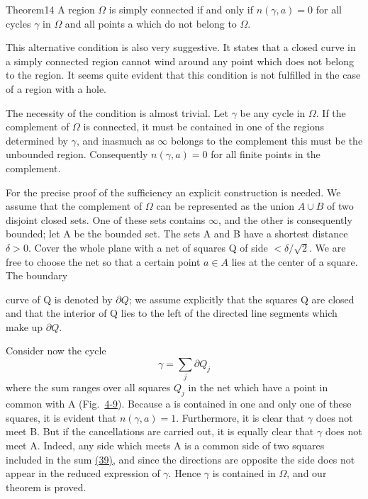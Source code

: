 \begin{originalstatement}{Theorem}{14}\label{thm:4.14}
A region $\Omega$ is simply connected if and only if $n(\gamma, a) = 0$ for all cycles $\gamma$ in $\Omega$ and all points a which do not belong to $\Omega$.
\end{originalstatement}
This alternative condition is also very suggestive. It states that a closed curve in a simply connected region cannot wind around any point which does not belong to the region. It seems quite evident that this condition is not fulfilled in the case of a region with a hole.

The necessity of the condition is almost trivial. Let $\gamma$ be any cycle in $\Omega$. If the complement of $\Omega$ is connected, it must be contained in one of the regions determined by $\gamma$, and inasmuch as $\infty$ belongs to the complement this must be the unbounded region. Consequently $n(\gamma,a)=0$ for all finite points in the complement.

For the precise proof of the sufficiency an explicit construction is needed. We assume that the complement of $\Omega$ can be represented as the union $A \cup B$ of two disjoint closed sets. One of these sets contains $\infty$, and the other is consequently bounded; let A be the bounded set. The sets A and B have a shortest distance $\delta > 0$. Cover the whole plane with a net of squares Q of side $< \delta/\sqrt{2}$. We are free to choose the net so that a certain point $a \in A$ lies at the center of a square. The boundary


curve of Q is denoted by $\partial Q$; we assume explicitly that the squares Q are closed and that the interior of Q lies to the left of the directed line segments which make up $\partial Q$.

Consider now the cycle
\begin{equation*}
\gamma = \sum_ {j} \partial Q _ {j}\tag{39}\label{eq:4.39}
\end{equation*}
where the sum ranges over all squares $Q_{j}$ in the net which have a point in common with A (Fig.~\hyperref[fig:4-9]{4-9}). Because a is contained in one and only one of these squares, it is evident that $n(\gamma,a)=1$. Furthermore, it is clear that $\gamma$ does not meet B. But if the cancellations are carried out, it is equally clear that $\gamma$ does not meet A. Indeed, any side which meets A is a common side of two squares included in the sum \hyperref[eq:4.39]{(39)}, and since the directions are opposite the side does not appear in the reduced expression of $\gamma$. Hence $\gamma$ is contained in $\Omega$, and our theorem is proved.

